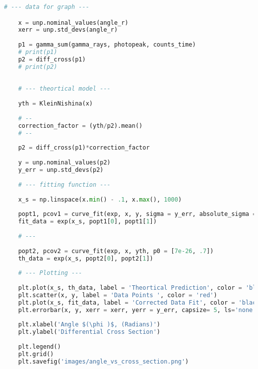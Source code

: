 \begin{lstlisting}[language = Python, frame = single]
    # --- data for graph --- 

    x = unp.nominal_values(angle_r)
    xerr = unp.std_devs(angle_r)
    
    p1 = gamma_sum(gamma_rays, photopeak, counts_time)
    # print(p1)
    p2 = diff_cross(p1)
    # print(p2)
    
    
    # --- theortical model --- 
    
    yth = KleinNishina(x)
    
    # -- 
    correction_factor = (yth/p2).mean()
    # --
    
    p2 = diff_cross(p1)*correction_factor
    
    y = unp.nominal_values(p2)
    y_err = unp.std_devs(p2)
    
    # --- fitting function --- 
    
    x_s = np.linspace(x.min() - .1, x.max(), 1000)
    
    popt1, pcov1 = curve_fit(exp, x, y, sigma = y_err, absolute_sigma = True, p0 = [1e-26, 2])
    fit_data = exp(x_s, popt1[0], popt1[1])
    
    # --- 
    
    popt2, pcov2 = curve_fit(exp, x, yth, p0 = [7e-26, .7])
    th_data = exp(x_s, popt2[0], popt2[1])
    
    # --- Plotting ---
    
    plt.plot(x_s, th_data, label = 'Theortical Prediction', color = 'blue')
    plt.scatter(x, y, label = 'Data Points ', color = 'red')
    plt.plot(x_s, fit_data, label = 'Corrected Data Fit', color = 'black')
    plt.errorbar(x, y, xerr = xerr, yerr = y_err, capsize= 5, ls='none', color = 'red')
    
    plt.xlabel('Angle $(\phi )$, (Radians)')
    plt.ylabel('Differential Cross Section')
    
    plt.legend()
    plt.grid()
    plt.savefig('images/angle_vs_cross_section.png')
\end{lstlisting}

